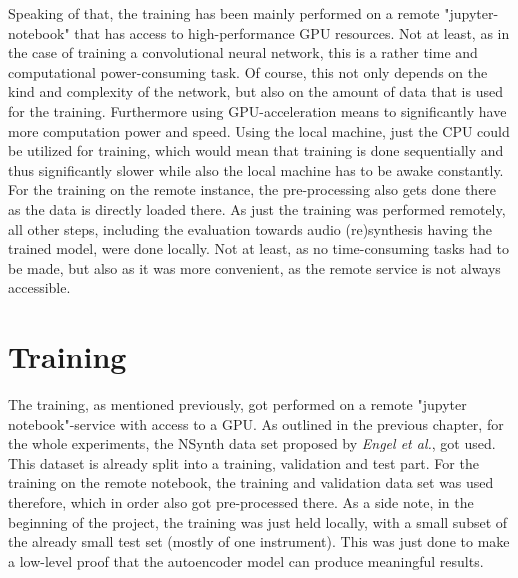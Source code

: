 Speaking of that, the training has been mainly performed on a remote "jupyter-notebook" that has access to high-performance GPU resources. Not at least, as in the case of training a convolutional neural network, this is a rather time and computational power-consuming task. Of course, this not only depends on the kind and complexity of the network, but also on the amount of data that is used for the training. Furthermore using GPU-acceleration means to significantly have more computation power and speed. Using the local machine, just the CPU could be utilized for training, which would mean that training is done sequentially and thus significantly slower while also the local machine has to be awake constantly. For the training on the remote instance, the pre-processing also gets done there as the data is directly loaded there. 
As just the training was performed remotely, all other steps, including the evaluation towards audio (re)synthesis having the trained model, were done locally. Not at least, as no time-consuming tasks had to be made, but also as it was more convenient, as the remote service is not always accessible.


\section{Training}
The training, as mentioned previously, got performed on a remote "jupyter notebook"-service with access to a GPU. As outlined in the previous chapter, for the whole experiments, the NSynth data set proposed by \textit{Engel et al.}\cite{Engel2017}, got used. This dataset is already split into a training, validation and test part. For the training on the remote notebook, the training and validation data set was used therefore, which in order also got pre-processed there. As a side note, in the beginning of the project, the training was just held locally, with a small subset of the already small test set (mostly of one instrument). This was just done to make a low-level proof that the autoencoder model can produce meaningful results. 

